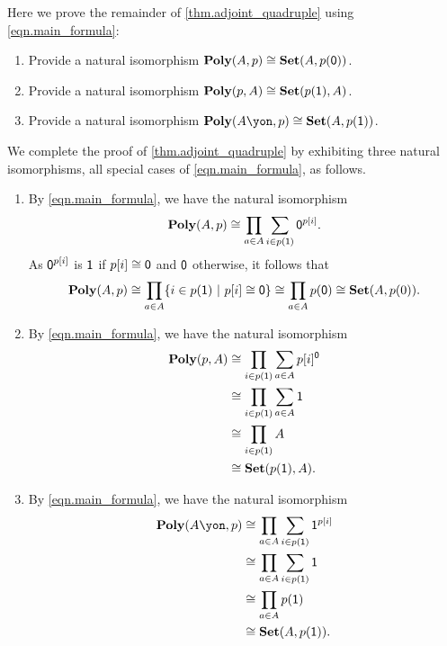 \documentclass[Book-Poly]{subfiles}
\begin{document}
\begin{exercise}\label{exc.adjoint_quadruple}
Here we prove the remainder of \cref{thm.adjoint_quadruple} using \eqref{eqn.main_formula}:
\begin{enumerate}
	\item Provide a natural isomorphism $\mathbf{Poly}(A,p)\cong\mathbf{Set}(A,p(\textsf{0}))$.
	\item \label{exc.adjoint_quadruple.pos_const} Provide a natural isomorphism $\mathbf{Poly}(p,A)\cong\mathbf{Set}(p(\textsf{1}),A)$.
	\item \label{exc.adjoint_quadruple.linear_pos} Provide a natural isomorphism $\poly(A\yon,p)\iso\smset(A,p(\1))$.
\qedhere
\end{enumerate}
\begin{solution}
We complete the proof of \cref{thm.adjoint_quadruple} by exhibiting three natural isomorphisms, all special cases of \eqref{eqn.main_formula}, as follows.
\begin{enumerate}
    \item By \eqref{eqn.main_formula}, we have the natural isomorphism
    \[
        \poly(A, p) %
        \iso \prod_{a \in A} \sum_{i \in p(\1)} \0^{p[i]}.
    \]
    As $\textsf{0}^{p[i]}$ is $\textsf{1}$ if $p[i] \cong \textsf{0}$ and $\textsf{0}$ otherwise, it follows that
    \[
        \mathbf{Poly}(A, p) \cong \prod_{a \in A} \{ i \in p(\textsf{1}) \ | \ p[i] \cong \textsf{0} \} \cong \prod_{a \in A} p(\textsf{0}) \cong \mathbf{Set}(A, p(0)).
    \]
    \item By \eqref{eqn.main_formula}, we have the natural isomorphism
    \begin{align*}
        \poly(p, A) %
        &\iso \prod_{i \in p(\1)} \sum_{a \in A} p[i]^\0 \\
        &\iso \prod_{i \in p(\1)} \sum_{a \in A} \1 \\
        &\iso \prod_{i \in p(\1)} A \\
        &\iso \smset(p(\1), A).
    \end{align*}
    \item By \eqref{eqn.main_formula}, we have the natural isomorphism
    \begin{align*}
        \poly(A\yon, p) %
        &\iso \prod_{a \in A} \sum_{i \in p(\1)} \1^{p[i]} \\
        &\iso \prod_{a \in A} \sum_{i \in p(\1)} \1 \\
        &\iso \prod_{a \in A} p(\1) \\
        &\iso \smset(A, p(\1)).
    \end{align*}
\end{enumerate}
\end{solution}
\end{exercise}
\end{document}
